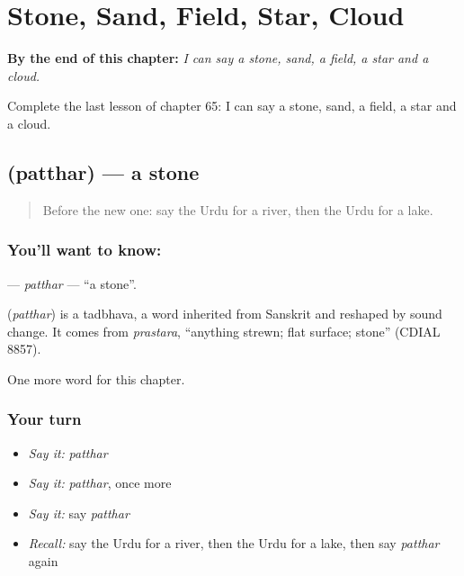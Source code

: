 
\chapter{Stone, Sand, Field, Star, Cloud}
\label{ch:ur-stone-sand-field-star-cloud}

\begin{chapteropening}
\textbf{By the end of this chapter:} \emph{I can say a stone, sand, a field, a star and a cloud.}

Complete the last lesson of chapter 65: I can say a stone, sand, a field, a star and a cloud.
\end{chapteropening}

\section[\texorpdfstring{\ur{پتھر} (patthar)}{پتھر (patthar)}]{ (patthar) — a stone}

\label{lesson:UR-C65-patthar}



\begin{quote}
Before the new one: say the Urdu for a river, then the Urdu for a lake.
\end{quote}

\subsection*{You'll want to know: }
\textbf{} — \emph{patthar} — \textquotedblleft{}a stone\textquotedblright{}.

\begin{cousinweb}
\textbf{} (\emph{patthar}) is a tadbhava, a word inherited from Sanskrit and reshaped by sound change. It comes from \emph{prastara}, \textquotedblleft{}anything strewn; flat surface; stone\textquotedblright{} (CDIAL 8857).
\end{cousinweb}

\begin{grammarlens}[title={What you've built}]
One more word for this chapter.
\end{grammarlens}

\subsection*{Your turn}
\begin{itemize}
\raggedright
  \item \emph{Say it:} \emph{patthar}
  \item \emph{Say it:} \emph{patthar}, once more
  \item \emph{Say it:} say \emph{patthar}
  \item \emph{Recall:} say the Urdu for a river, then the Urdu for a lake, then say \emph{patthar} again
\end{itemize}

